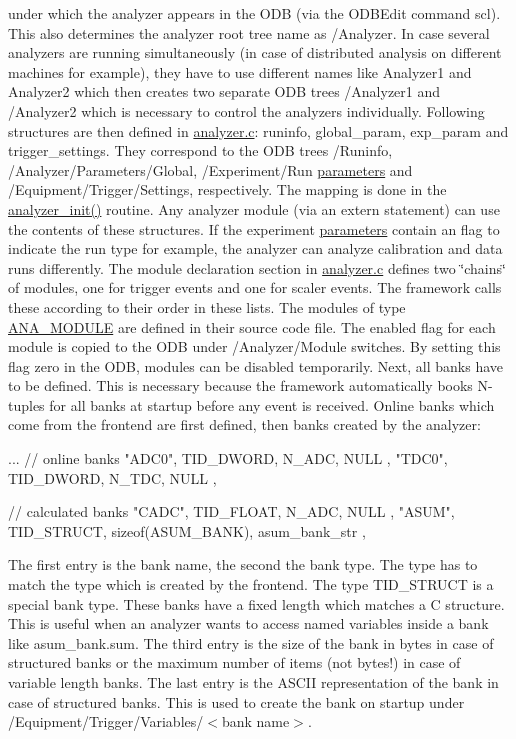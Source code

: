 under which the analyzer appears in the ODB (via the ODBEdit command scl). This also determines the analyzer root tree name as /Analyzer. In case several analyzers are running simultaneously (in case of distributed analysis on different machines for example), they have to use different names like Analyzer1 and Analyzer2 which then creates two separate ODB trees /Analyzer1 and /Analyzer2 which is necessary to control the analyzers individually. Following structures are then defined in \hyperlink{analyzer_8c}{analyzer.c}: runinfo, global\_\-param, exp\_\-param and trigger\_\-settings. They correspond to the ODB trees /Runinfo, /Analyzer/Parameters/Global, /Experiment/Run \hyperlink{structparameters}{parameters} and /Equipment/Trigger/Settings, respectively. The mapping is done in the \hyperlink{analyzer_8c_afeea792d4dbe0001bd025397e494ab5b}{analyzer\_\-init()} routine. Any analyzer module (via an extern statement) can use the contents of these structures. If the experiment \hyperlink{structparameters}{parameters} contain an flag to indicate the run type for example, the analyzer can analyze calibration and data runs differently. The module declaration section in \hyperlink{analyzer_8c}{analyzer.c} defines two \char`\"{}chains\char`\"{} of modules, one for trigger events and one for scaler events. The framework calls these according to their order in these lists. The modules of type \hyperlink{structANA__MODULE}{ANA\_\-MODULE} are defined in their source code file. The enabled flag for each module is copied to the ODB under /Analyzer/Module switches. By setting this flag zero in the ODB, modules can be disabled temporarily. Next, all banks have to be defined. This is necessary because the framework automatically books N-\/tuples for all banks at startup before any event is received. Online banks which come from the frontend are first defined, then banks created by the analyzer: 
\begin{DoxyCode}
 ...
 // online banks 
 { "ADC0", TID_DWORD, N_ADC, NULL },
 { "TDC0", TID_DWORD, N_TDC, NULL },

 // calculated banks  
 { "CADC", TID_FLOAT, N_ADC, NULL },
 { "ASUM", TID_STRUCT, sizeof(ASUM_BANK),
  asum_bank_str },
\end{DoxyCode}


The first entry is the bank name, the second the bank type. The type has to match the type which is created by the frontend. The type TID\_\-STRUCT is a special bank type. These banks have a fixed length which matches a C structure. This is useful when an analyzer wants to access named variables inside a bank like asum\_\-bank.sum. The third entry is the size of the bank in bytes in case of structured banks or the maximum number of items (not bytes!) in case of variable length banks. The last entry is the ASCII representation of the bank in case of structured banks. This is used to create the bank on startup under /Equipment/Trigger/Variables/$<$bank name$>$.

